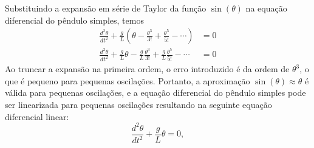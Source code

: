 \documentclass[12pt,a4paper]{article}
\begin{document}
Substituindo a expansão em série de Taylor da função $\sin(\theta)$ na equação diferencial do pêndulo simples, temos
\begin{align*}
    \frac{d^2\theta}{dt^2} + \frac{g}{L} \left( \theta - \frac{\theta^3}{3!} + \frac{\theta^5}{5!} - \cdots \right) &= 0 \\
    \frac{d^2\theta}{dt^2} + \frac{g}{L} \theta - \frac{g}{L} \frac{\theta^3}{3!} + \frac{g}{L} \frac{\theta^5}{5!} - \cdots &= 0
\end{align*}
Ao truncar a expansão na primeira ordem, o erro introduzido é da ordem de $\theta^3$, o que é pequeno para pequenas oscilações. Portanto, a aproximação $\sin(\theta) \approx \theta$ é válida para pequenas oscilações, e a equação diferencial do pêndulo simples pode ser linearizada para pequenas oscilações resultando na seguinte equação diferencial linear:
\begin{equation}
    \frac{d^2\theta}{dt^2} + \frac{g}{L} \theta = 0, \label{eq:equacao_diferencial_pendulo_linearizada}
\end{equation}
\end{document}
